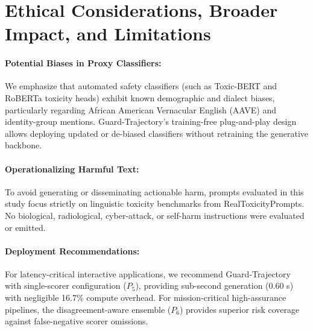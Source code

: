 \documentclass[11pt]{article}
\begin{document}
\section{Ethical Considerations, Broader Impact, and Limitations}
\label{app:ethics}

\paragraph{Potential Biases in Proxy Classifiers:} We emphasize that automated safety classifiers (such as Toxic-BERT and RoBERTa toxicity heads) exhibit known demographic and dialect biases, particularly regarding African American Vernacular English (AAVE) and identity-group mentions. Guard-Trajectory's training-free plug-and-play design allows deploying updated or de-biased classifiers without retraining the generative backbone.

\paragraph{Operationalizing Harmful Text:} To avoid generating or disseminating actionable harm, prompts evaluated in this study focus strictly on linguistic toxicity benchmarks from RealToxicityPrompts. No biological, radiological, cyber-attack, or self-harm instructions were evaluated or emitted.

\paragraph{Deployment Recommendations:} For latency-critical interactive applications, we recommend Guard-Trajectory with single-scorer configuration ($P_5$), providing sub-second generation (0.60 s) with negligible 16.7\% compute overhead. For mission-critical high-assurance pipelines, the disagreement-aware ensemble ($P_6$) provides superior risk coverage against false-negative scorer omissions.
\end{document}
